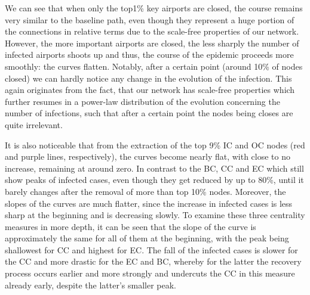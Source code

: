 We can see that when only the top1\% key airports are closed, the course remains very similar to the baseline path, even though they represent a huge portion of the connections in relative terms due to the scale-free properties of our network. However, the more important airports are closed, the less sharply the number of infected airports shoots up and thus, the course of the epidemic proceeds more smoothly: the curves flatten. Notably, after a certain point (around 10\% of nodes closed) we can hardly notice any change in the evolution of the infection. This again originates from the fact, that our network has scale-free properties which further resumes in a power-law distribution of the evolution concerning the number of infections, such that after a certain point the nodes being closes are quite irrelevant.

It is also noticeable that from the extraction of the top 9\% IC and OC nodes (red and purple lines, respectively), the curves become nearly flat, with close to no increase, remaining at around zero. In contrast to the BC, CC and EC which still show peaks of infected cases, even though they get reduced by up to 80\%, until it barely changes after the removal of more than top 10\% nodes. Moreover, the slopes of the curves are much flatter, since the increase in infected cases is less sharp at the beginning and is decreasing slowly. To examine these three centrality measures in more depth, it can be seen that the slope of the curve is approximately the same for all of them at the beginning, with the peak being shallowest for CC and highest for EC. The fall of the infected cases is slower for the CC and more drastic for the EC and BC, whereby for the latter the recovery process occurs earlier and more strongly and undercuts the CC in this measure already early, despite the latter’s smaller peak.

